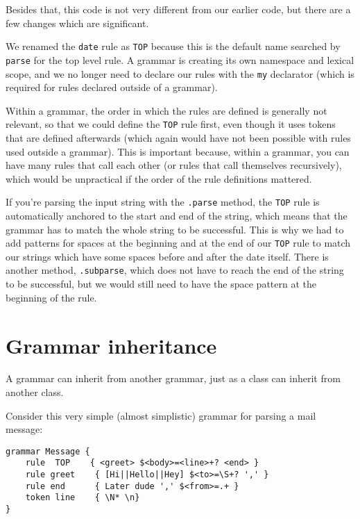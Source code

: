 Besides that, this code is not very different from our 
earlier code, but there are a few changes which are 
significant.


We renamed the {\tt date} rule as {\tt TOP} because this 
is the default name searched by {\tt parse} for the top level 
rule. A grammar is creating its own namespace and 
lexical scope, and we no longer need to declare our rules 
with the {\tt my} declarator (which is required for
rules declared outside of a grammar). 

Within a grammar, the order in which the rules are 
defined is generally not relevant, so that we could define 
the {\tt TOP} rule first, even though it uses tokens 
that are defined afterwards (which again would have not 
been possible with rules used outside a grammar). This is 
important because, within a grammar, you can have many rules 
that call each other (or rules that call themselves 
recursively), which would be unpractical if the order of 
the rule definitions mattered.

If you're parsing the input string with the {\tt .parse} method,
the {\tt TOP} rule is automatically anchored to the start and end 
of the string, which means that the grammar has to match 
the whole string to be successful. This is why we had to 
add patterns for spaces at the beginning and at the end of 
our {\tt TOP} rule to match our strings which have some 
spaces before and after the date itself. There is another 
method, {\tt .subparse}, which does not have to reach the 
end of the string to be successful, but we would still need to 
have the space pattern at the beginning of the rule.

\section{Grammar inheritance}

A grammar can inherit from another grammar, just as a 
class can inherit from another class.

Consider this very simple (almost simplistic) grammar 
for parsing a mail message:

\begin{verbatim}
grammar Message {
    rule  TOP    { <greet> $<body>=<line>+? <end> }
    rule greet    { [Hi||Hello||Hey] $<to>=\S+? ',' }
    rule end      { Later dude ',' $<from>=.+ }
    token line    { \N* \n}
}
\end{verbatim}

